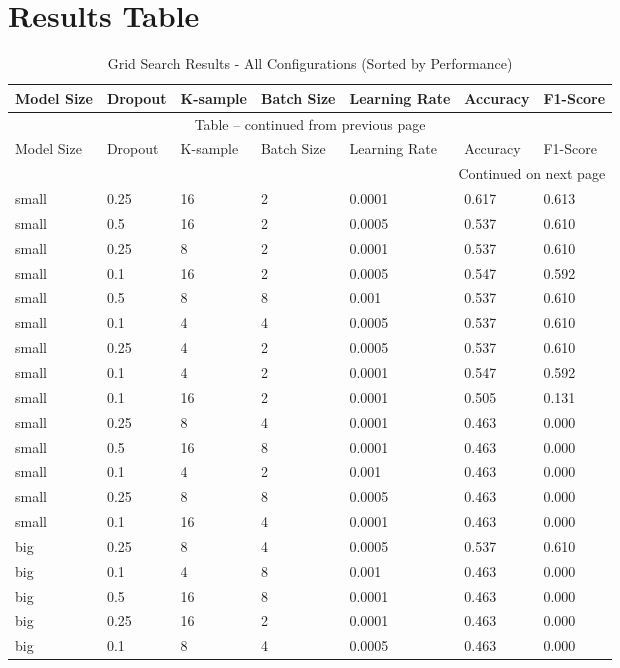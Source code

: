 \documentclass{article}
\begin{document}
\section{Results Table}
\begin{longtable}{lllllll}
\caption{Grid Search Results - All Configurations (Sorted by Performance)}\\
\toprule
Model Size & Dropout & K-sample & Batch Size & Learning Rate & Accuracy & F1-Score \\
\midrule
\endfirsthead
\multicolumn{7}{c}{Table \thetable{} -- continued from previous page} \\
\toprule
Model Size & Dropout & K-sample & Batch Size & Learning Rate & Accuracy & F1-Score \\
\midrule
\endhead
\midrule
\multicolumn{7}{r}{{Continued on next page}} \\
\endfoot
\bottomrule
\endlastfoot

\rowcolor{green!20} small & 0.25 & 16 & 2 & 0.0001 & 0.617 & 0.613 \\
\rowcolor{green!20} small & 0.5 & 16 & 2 & 0.0005 & 0.537 & 0.610 \\
\rowcolor{green!20} small & 0.25 & 8 & 2 & 0.0001 & 0.537 & 0.610 \\
\rowcolor{green!20} small & 0.1 & 16 & 2 & 0.0005 & 0.547 & 0.592 \\

small & 0.5 & 8 & 8 & 0.001 & 0.537 & 0.610 \\
small & 0.1 & 4 & 4 & 0.0005 & 0.537 & 0.610 \\
small & 0.25 & 4 & 2 & 0.0005 & 0.537 & 0.610 \\
small & 0.1 & 4 & 2 & 0.0001 & 0.547 & 0.592 \\

small & 0.1 & 16 & 2 & 0.0001 & 0.505 & 0.131 \\
small & 0.25 & 8 & 4 & 0.0001 & 0.463 & 0.000 \\
small & 0.5 & 16 & 8 & 0.0001 & 0.463 & 0.000 \\

small & 0.1 & 4 & 2 & 0.001 & 0.463 & 0.000 \\
small & 0.25 & 8 & 8 & 0.0005 & 0.463 & 0.000 \\
small & 0.1 & 16 & 4 & 0.0001 & 0.463 & 0.000 \\

big & 0.25 & 8 & 4 & 0.0005 & 0.537 & 0.610 \\
big & 0.1 & 4 & 8 & 0.001 & 0.463 & 0.000 \\
big & 0.5 & 16 & 8 & 0.0001 & 0.463 & 0.000 \\
big & 0.25 & 16 & 2 & 0.0001 & 0.463 & 0.000 \\
big & 0.1 & 8 & 4 & 0.0005 & 0.463 & 0.000 \\

\end{longtable}
\end{document}
